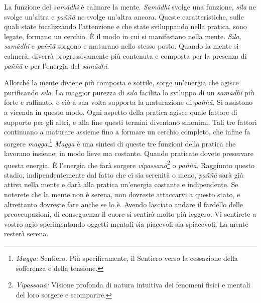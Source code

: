 La funzione del \emph{samādhi} è calmare la mente. \emph{Samādhi} svolge
una funzione, \emph{sīla} ne svolge un'altra e \emph{paññā} ne svolge
un'altra ancora. Queste caratteristiche, sulle quali state focalizzando
l'attenzione e che state sviluppando nella pratica, sono legate, formano
un cerchio. È il modo in cui si manifestano nella mente. \emph{Sīla,}
\emph{samādhi} e \emph{paññā} sorgono e maturano nello stesso posto.
Quando la mente si calmerà, diverrà progressivamente più contenuta e
composta per la presenza di \emph{paññā} e per l'energia del
\emph{samādhi}.

Allorché la mente diviene più composta e sottile, sorge un'energia che
agisce purificando \emph{sīla}. La maggior purezza di \emph{sīla}
facilita lo sviluppo di un \emph{samādhi} più forte e raffinato, e ciò a
sua volta supporta la maturazione di \emph{paññā}. Si assistono a
vicenda in questo modo. Ogni aspetto della pratica agisce quale fattore
di supporto per gli altri, e alla fine questi termini diventano
sinonimi. Tali tre fattori continuano a maturare assieme fino a formare
un cerchio completo, che infine fa sorgere \emph{magga}.\footnote{%
  \emph{Magga:}
  Sentiero. Più specificamente, il Sentiero verso la cessazione della
  sofferenza e della tensione.} \emph{Magga} è una sintesi di queste tre
funzioni della pratica che lavorano insieme, in modo lieve ma costante.
Quando praticate dovete preservare questa energia. È l'energia che farà
sorgere \emph{vipassanā}\footnote{\emph{Vipassanā:} Visione profonda di
  natura intuitiva dei fenomeni fisici e mentali del loro sorgere e
  scomparire.} o \emph{paññā}. Raggiunto questo stadio,
indipendentemente dal fatto che ci sia serenità o meno, \emph{paññā}
sarà già attiva nella mente e darà alla pratica un'energia costante e
indipendente. Se noterete che la mente non è serena, non dovreste
attaccarvi a questo stato, e altrettanto dovreste fare anche se lo è.
Avendo lasciato andare il fardello delle preoccupazioni, di conseguenza
il cuore si sentirà molto più leggero. Vi sentirete a vostro agio
sperimentando oggetti mentali sia piacevoli sia spiacevoli. La mente
resterà serena.

